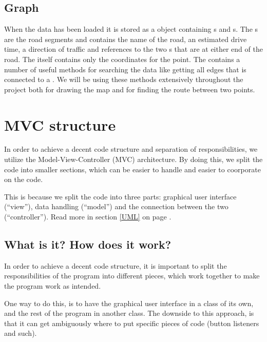 \subsection{Graph}
\label{BG-DS-G}
When the data has been loaded it is stored as a  object containing 
s and s. The s are the 
road segments and contains the name of the road, an estimated drive time, 
a direction of traffic and references to the two s that are at 
either end of the road.  The  itself contains only the coordinates 
for the point. The  contains a number of useful methods for 
searching the data like getting all edges that is connected to a . 
We will be using these methods extensively throughout the project both for 
drawing the map and for finding the route between two points.

\section{MVC structure}
\label{BG-MVC}
In order to achieve a decent code structure and separation of responsibilities, 
we utilize the Model-View-Controller (MVC) architecture. By doing this, we split 
the code into smaller sections, which can be easier to handle and easier to 
coorporate on the code.

This is because we split the code into three parts: graphical user interface 
(``view''), data handling (``model'') and the connection between the two 
(``controller''). Read more in section \ref{UML}  on 
page \pageref{UML}.

\subsection{What is it? How does it work?}
In order to achieve a decent code structure, it is important to split the 
responsibilities of the program into different pieces, which work together 
to make the program work as intended.

One way to do this, is to have the graphical user interface in a class of its
own, and the rest of the program in another class. The downside to this
approach, is that it can get ambiguously where to put specific pieces of code
(button listeners and such).

